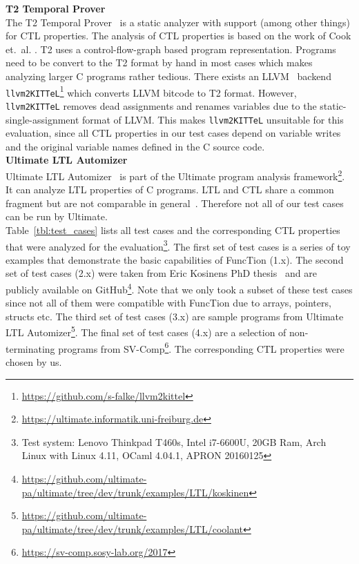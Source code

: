 \documentclass[11pt,a4paper,titlepage]{article}
\theoremstyle{definition}
\begin{document}
\textbf{T2 Temporal Prover}\\
The T2 Temporal Prover~\cite{DBLP:conf/tacas/BrockschmidtCIK16} is a static analyzer with support (among other things) for CTL properties.
The analysis of CTL properties is based on the work of Cook et.\ al. \cite{DBLP:journals/fmsd/CookKV12}. T2 uses a control-flow-graph based
program representation. Programs need to be convert to the T2 format by hand in most cases which makes analyzing larger C programs rather tedious.
There exists an LLVM~\cite{Lattner:2004:LCF:977395.977673}
backend \texttt{llvm2KITTeL}\footnote{\url{https://github.com/s-falke/llvm2kittel}} which converts LLVM bitcode to T2 format. 
However, \texttt{llvm2KITTeL} removes dead assignments and renames variables due to the static-single-assignment format of LLVM. 
This makes \texttt{llvm2KITTeL} unsuitable for this evaluation, since all CTL properties in our test cases depend on variable writes and 
the original variable names defined in the C source code.\\

\textbf{Ultimate LTL Automizer}\\
Ultimate LTL Automizer~\cite{DBLP:conf/cav/DietschHLP15} 
is part of the Ultimate program analysis framework\footnote{\url{https://ultimate.informatik.uni-freiburg.de}}. 
It can analyze LTL properties of C programs. LTL and CTL share a common fragment but are not comparable in general~\cite{Baier:2008:PMC}.
Therefore not all of our test cases can be run by Ultimate.\\

Table~\ref{tbl:test_cases} lists all test cases and the corresponding CTL properties that were analyzed for the
evaluation\footnote{Test system: 
    Lenovo Thinkpad T460s, Intel i7-6600U, 20GB Ram, Arch Linux with Linux 4.11, OCaml 4.04.1, APRON 20160125
}. 
The first set of test cases is a series of toy examples that demonstrate the basic capabilities of FuncTion (1.x). 
The second set of test cases (2.x) were taken from Eric Kosinens PhD thesis~\cite{KoskinenPhd} and are publicly available on 
GitHub\footnote{\url{https://github.com/ultimate-pa/ultimate/tree/dev/trunk/examples/LTL/koskinen}}. 
Note that we only took a subset of these test cases since not all of them were 
compatible with FuncTion due to arrays, pointers, structs etc. 
The third set of test cases (3.x) are sample programs from 
Ultimate LTL Automizer\footnote{\url{https://github.com/ultimate-pa/ultimate/tree/dev/trunk/examples/LTL/coolant}}. 
The final set of test cases (4.x) are a selection of non-terminating programs from SV-Comp\footnote{\url{https://sv-comp.sosy-lab.org/2017}}. 
The corresponding CTL properties were chosen by us.\\
\end{document}
